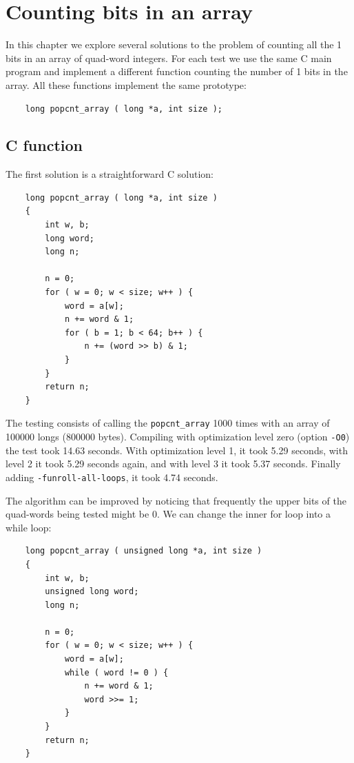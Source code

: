 \documentclass[11pt,b5paper]{book}
\begin{document}
\chapter{Counting bits in an array}

In this chapter we explore several solutions to the problem of counting
all the 1 bits in an array of quad-word integers.
For each test we use the same C main program and implement a different function
counting the number of 1 bits in the array.
All these functions implement the same prototype:
\begin{verbatim}
    long popcnt_array ( long *a, int size );
\end{verbatim}

\section{C function}

The first solution is a straightforward C solution:
\begin{verbatim}
    long popcnt_array ( long *a, int size )
    {
        int w, b;
        long word;
        long n;

        n = 0;
        for ( w = 0; w < size; w++ ) {
            word = a[w];
            n += word & 1;
            for ( b = 1; b < 64; b++ ) {
                n += (word >> b) & 1;
            }
        }
        return n;
    }
\end{verbatim}

The testing consists of calling the {\tt popcnt\_array} 1000 times
with an array of 100000 longs (800000 bytes).
Compiling with optimization level zero (option {\tt -O0}) the test took 14.63 seconds.
With optimization level 1, it took 5.29 seconds, with level 2 it took 5.29
seconds again, and with level 3 it took 5.37 seconds.
Finally adding {\tt -funroll-all-loops}, it took 4.74 seconds.

The algorithm can be improved by noticing that frequently the upper bits of
the quad-words being tested might be 0.
We can change the inner for loop into a while loop:
\begin{verbatim}
    long popcnt_array ( unsigned long *a, int size )
    {
        int w, b;
        unsigned long word;
        long n;
    
        n = 0;
        for ( w = 0; w < size; w++ ) {
            word = a[w];
            while ( word != 0 ) {
                n += word & 1;
                word >>= 1;
            }
        }
        return n;
    }
\end{verbatim}
\end{document}
